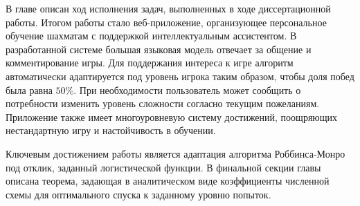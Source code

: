 В главе описан ход исполнения задач, выполненных в ходе диссертационной работы. 
Итогом работы стало веб-приложение, организующее персональное обучение шахматам с поддержкой интеллектуальным ассистентом.
В разработанной системе большая языковая модель отвечает за общение и комментирование игры.
Для поддержания интереса к игре алгоритм автоматически адаптируется под уровень игрока таким образом, чтобы
доля побед была равна $50\%$. При необходимости пользователь 
может сообщить о потребности изменить уровень сложности согласно текущим пожеланиям.
Приложение также имеет многоуровневую систему достижений, поощряющих 
нестандартную игру и настойчивость в обучении.


Ключевым достижением работы является адаптация алгоритма Роббинса-Монро под отклик, заданный логистической функции. В финальной
секции главы описана теорема, задающая в аналитическом виде коэффициенты численной схемы для оптимального спуска
к заданному уровню попыток. 








